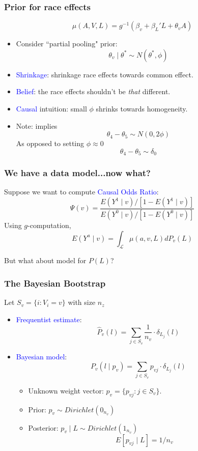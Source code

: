 \documentclass[xcolor=x11names,compress]{beamer}
\renewcommand{\(}{\begin{columns}}
\renewcommand{\)}{\end{columns}}
\newcommand{\<}[1]{\begin{column}{#1}}
\renewcommand{\>}{\end{column}}
\begin{document}
\begin{frame}
	\frametitle{Prior for race effects}
	$$ \mu(A, V, L) = g^{-1}( \beta_v + \beta_L' L +  \theta_v A ) $$
	
	\begin{itemize}
	\item Consider ``partial pooling" prior: 
	\pause
	$$ \theta_v \mid \theta^* \sim N(\theta^*, \phi)  $$
	\item \textcolor{blue}{Shrinkage}: shrinkage race effects towards common effect. 
	\item \textcolor{blue}{Belief}: the race effects shouldn't be \textit{that} different. 
	\item \textcolor{blue}{Causal} intuition: small $\phi$ shrinks towards homogeneity.
	\pause
	\item Note: implies 
	$$\theta_4 - \theta_5 \sim N(0, 2\phi )$$
	As opposed to setting $\phi \approx 0$
	$$ \theta_4 - \theta_5 \sim \delta_0 $$
	\end{itemize}	
\end{frame}

\begin{frame}
	\frametitle{We have a data model...now what?}
	
	Suppose we want to compute \textcolor{blue}{Causal Odds Ratio}:
	$$ \Psi(v) = \frac{ E(Y^1 \mid v)/[1-E(Y^1 \mid v)] }{E(Y^0 \mid v)/[1-E(Y^0 \mid v)] } $$
	\pause
	Using $g$-computation, 
	$$ E(Y^a \mid v ) = \int_{\mathcal{L}} \mu(a, v, L) dP_v(L) $$
	
	But what about model for $P(L)$?
\end{frame}

\begin{frame}
	\frametitle{The Bayesian Bootstrap}
	Let $S_v = \{ i : V_i = v \}$ with size $n_z$
	\pause
	\begin{itemize}
	 \item  \textcolor{blue}{Frequentist estimate}: 
	 $$\hat P_v( l ) = \sum_{j \in S_v } \frac{1}{n_v} \cdot \delta_{L_j } (l)$$
	 \pause
	 \item \textcolor{blue}{Bayesian model}:
	 $$P_v( l \mid p_{v}) = \sum_{j \in S_v} p_{vj} \cdot \delta_{L_j} ( l )$$
	 \pause
	 \begin{itemize}
	 	\item Unknown weight vector: $p_v = \{ p_{vj} : j \in S_v \} $.
		\pause
	 	\item Prior: $p_{v} \sim Dirichlet(0_{n_v} )$
		\pause
		\item Posterior: $p_{v} \mid L \sim Dirichlet(1_{n_v})$
		$$E[p_{vj} \mid L] = 1/n_{v} $$
	 \end{itemize}
	\end{itemize}	
\end{frame}
\end{document}
